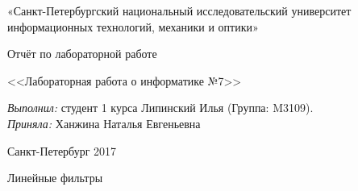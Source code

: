 \documentclass[a4paper,12pt]{article}
\begin{document}

\begin{titlepage}
\newpage
\begin{center}
\large «Санкт-Петербургский национальный исследовательский университет информационных технологий, механики и оптики»\\ \hrulefill
\end{center}
\vspace{8em}
\begin{center}
\huge Отчёт по лабораторной работе\\ [10pt]
\end{center}
\vspace{2.5em}
\begin{center}
\large <<Лабораторная работа о информатике №7>>\\
\end{center}

\vspace{6em}

\begin{flushleft}
\emph{Выполнил:} студент 1 курса Липинский Илья (Группа: M3109).\\
\vspace{2.5em}
\emph{Приняла:} Ханжина Наталья Евгеньевна \\
\end{flushleft}

\vspace{\fill}

\begin{center}
Санкт-Петербург 2017
\end{center}

\end{titlepage}


\newpage
\begin{center}
Линейные фильтры
\end{center}
\end{document}
